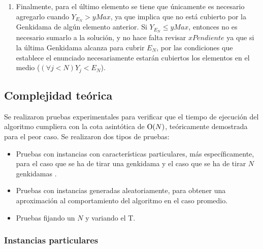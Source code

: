 \begin{enumerate}
{\begin{enumerate}
{\begin{enumerate}
\begin{enumerate}
						\end{enumerate}
					\end{enumerate}
					}
				\end{enumerate}
		}
		\item{
			Finalmente, para el último elemento se tiene que únicamente
			es necesario agregarlo cuando $Y_{E_N} > yMax$, ya que
			implica que no está cubierto por la Genkidama de algún
			elemento anterior. Si $Y_{E_N} \leq yMax$, entonces no es
			necesario sumarlo a la solución, y no hace falta revisar
			$xPendiente$ ya que si la última Genkidama alcanza para
			cubrir $E_N$, por las condiciones que establece el
			enunciado necesariamente estarán cubiertos los elementos en
			el medio ($(\forall j < N) Y_j < E_N$).}

	\end{enumerate}

    \subsection{Complejidad teórica}
         
       


	Se realizaron pruebas experimentales para verificar que el tiempo de ejecución del algoritmo cumpliera con la cota asintótica de $\operatorname{O}(N)$, teóricamente demostrada para el peor caso. Se realizaron dos tipos de pruebas:
        
        \begin{itemize}
            \item Pruebas con instancias con características particulares, más específicamente, para el caso que se ha de tirar una genkidama y el caso que se ha de tirar $N$ genkidamas .
            \item Pruebas con instancias generadas aleatoriamente, para obtener una aproximación al comportamiento del algoritmo en el caso promedio.
            \item Pruebas fijando un $N$ y variando el T. 
        \end{itemize}

        \subsubsection{Instancias particulares}

